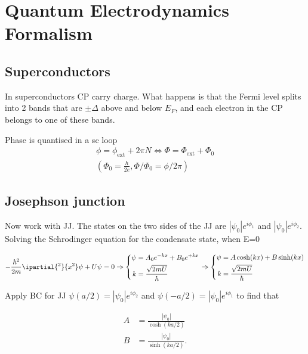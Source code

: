 \section{Quantum Electrodynamics Formalism\label{subsec:l2-CPB}}
  
   \subsection{Superconductors}
   In superconductors CP carry charge. What happens is that the Fermi level splits into 2 bands that are $\pm\Delta$ above and below $E_F$, and each electron in the CP belongs to one of these bands. 
   
   
   {{ Phase is quantised in a sc loop
	\begin{equation}
		\begin{aligned}
			\phi = \phi_\text{ext} + 2\pi N \Leftrightarrow \Phi = \Phi_\text{ext} + \Phi_0 \\(\Phi_0 = \frac{h}{2e}, \Phi/\Phi_0=\phi/2\pi)
		\end{aligned}
	\end{equation}
   }}

   \subsection{Josephson junction}
   Now work with JJ. The states on the two sides of the JJ are $\left|\psi_0\right|e^{i\phi_1}$ and $\left|\psi_0\right|e^{i\phi_2}$. Solving the Schrodinger equation for the condensate state, when E=0
   
   \begin{equation}
   	-\frac{\hbar^2}{2m}\ipartial{^2}{x^2}\psi+U\psi = 0 \Rightarrow
   	\left\lbrace\begin{aligned}
	   	\psi & = A_0e^{-kx}+B_0e^{+kx}\\
	   	k & = \frac{\sqrt{2mU}}{\hbar}
   	\end{aligned} \right. \Rightarrow
   	\left\lbrace\begin{aligned}
   	\psi & = A\cosh(kx)+B\sinh(kx)\\
   	k & = \frac{\sqrt{2mU}}{\hbar}
   	\end{aligned} \right.
   \end{equation}
   
   \noindent Apply BC for JJ $\psi(a/2) = \left|\psi_0\right|e^{i\phi_2}$ and $\psi(-a/2) = \left|\psi_0\right|e^{i\phi_1}$ to find that
   
   \begin{align}
	   A &= \frac{\left|\psi_0\right|}{\cosh(ka/2)}\\
	   B &= \frac{\left|\psi_0\right|}{\sinh(ka/2)}.
   \end{align}
   
